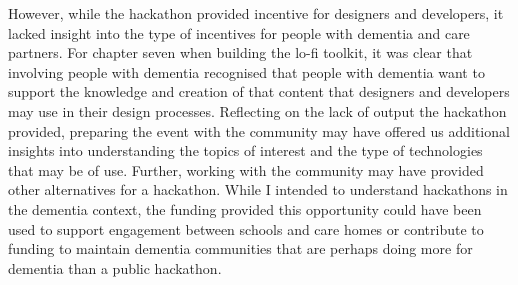 However, while the hackathon provided incentive for designers and developers, it lacked insight into the type of incentives for people with dementia and care partners. For chapter seven when building the lo-fi toolkit, it was clear that involving people with dementia recognised that people with dementia want to support the knowledge and creation of that content that designers and developers may use in their design processes. Reflecting on the lack of output the hackathon provided, preparing the event with the community may have offered us additional insights into understanding the topics of interest and the type of technologies that may be of use. Further, working with the community may have provided other alternatives for a hackathon. While I intended to understand hackathons in the dementia context, the funding provided this opportunity could have been used to support engagement between schools and care homes or contribute to funding to maintain dementia communities that are perhaps doing more for dementia than a public hackathon.




